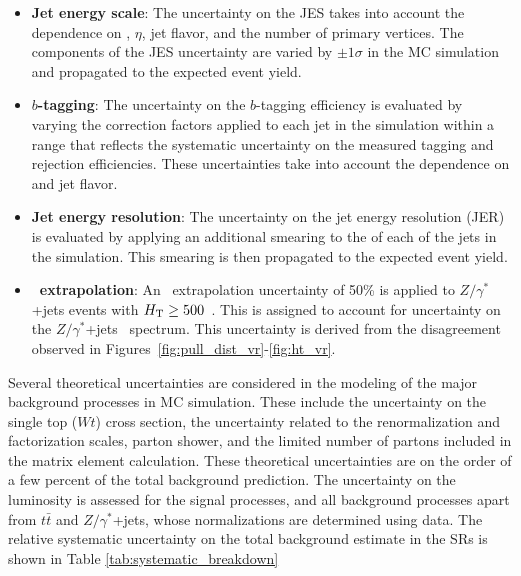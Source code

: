 \begin{itemize}
\item \textbf{Jet energy scale}:
The uncertainty on the JES takes into account the dependence on \pt, $\eta$,
jet flavor, and the number of primary vertices. The components of the JES
uncertainty are varied by $\pm1\sigma$ in the MC simulation and propagated to
the expected event yield.
\item \textbf{$b$-tagging}:
The uncertainty on the $b$-tagging efficiency is evaluated by varying the
correction factors applied to each jet in the simulation within a range that
reflects the systematic uncertainty on the measured tagging and rejection
efficiencies. These uncertainties take into account the dependence on \pt and
jet flavor.
\item \textbf{Jet energy resolution}:
  The uncertainty on the jet energy resolution (JER) is evaluated by
  applying an additional smearing to the \pt of each of the jets in the
  simulation. This smearing is then propagated to the expected event yield.
\item \textbf{\HT\ extrapolation}:
An \HT\ extrapolation uncertainty of 50\% is applied to $Z/\gamma^{*}$+jets
events with $H_{\mathrm{T}} \geq 500$~\GeV. This is assigned to account for
uncertainty on the $Z/\gamma^{*}$+jets \HT\ spectrum. This uncertainty
is derived from the disagreement observed in
Figures~\ref{fig:pull_dist_vr}-\ref{fig:ht_vr}.
\end{itemize}

Several theoretical uncertainties are considered in the modeling of the major
background processes in MC simulation. These include the uncertainty on the
single top ($Wt$) cross section, the uncertainty related to the renormalization
and factorization scales, parton shower, and the limited number of partons
included in the matrix element calculation. These theoretical uncertainties
are on the order of a few percent of the total background prediction. The
uncertainty on the luminosity is assessed for the signal processes, and all
background processes apart from $t\bar{t}$ and $Z/\gamma^{*}$+jets, whose
normalizations are determined using data.
The relative systematic uncertainty on the total background estimate in the
SRs is shown in Table \ref{tab:systematic_breakdown}

